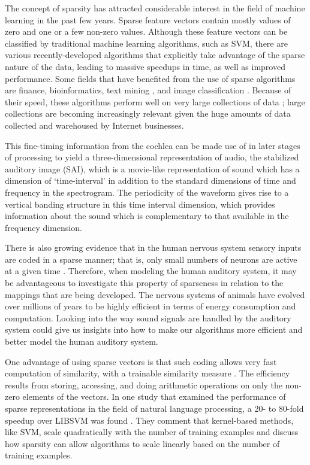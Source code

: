 The concept of sparsity has attracted considerable interest in the
field of machine learning in the past few years.  Sparse feature
vectors contain mostly values of zero and one or a few non-zero
values.  Although these feature vectors can be classified by
traditional machine learning algorithms, such as SVM, there are various
recently-developed algorithms that explicitly take advantage of
the sparse nature of the data, leading to massive speedups in time, as
well as improved performance.  Some fields that have benefited from
the use of sparse algorithms are finance, bioinformatics, text mining
\cite{balakrishnan2008}, and image classification \cite{chechik2010}.
Because of their speed, these algorithms perform well on very large
collections of data \cite{bottou2007}; large collections are becoming 
increasingly relevant given the huge amounts of data collected and warehoused 
by Internet businesses.

This fine-timing information from the cochlea can be made use of in
later stages of processing to yield a three-dimensional representation
of audio, the stabilized auditory image (SAI)\cite{patterson2000},
which is a movie-like representation of sound which has a dimension of
`time-interval' in addition to the standard dimensions of time and
frequency in the spectrogram. The periodicity of the waveform gives
rise to a vertical banding structure in this time interval dimension,
which provides information about the sound which is complementary to
that available in the frequency dimension.

There is also growing evidence that in the human nervous
system sensory inputs are coded in a sparse manner; that is, only
small numbers of neurons are active at a given time
\cite{olshausen2004}.  Therefore, when modeling the human auditory
system, it may be advantageous to investigate this property of
sparseness in relation to the mappings that are being developed. The
nervous systems of animals have evolved over millions of years to be
highly efficient in terms of energy consumption and computation. 
Looking into the way sound signals are handled by the auditory
system could give us insights into how to make our algorithms more
efficient and better model the human auditory system.

One advantage of using sparse vectors is that such coding allows very fast
computation of similarity, with a trainable similarity measure 
\cite{chechik2010}. The efficiency results from storing, accessing, and doing 
arithmetic operations on only the non-zero elements of the vectors.   
In one study that examined the performance of sparse
representations in the field of natural language processing, a 20- to
80-fold speedup over LIBSVM was found \cite{haffner2006}.  They
comment that kernel-based methods, like SVM, scale quadratically with
the number of training examples and discuss how sparsity can allow
algorithms to scale linearly based on the number of training examples.

